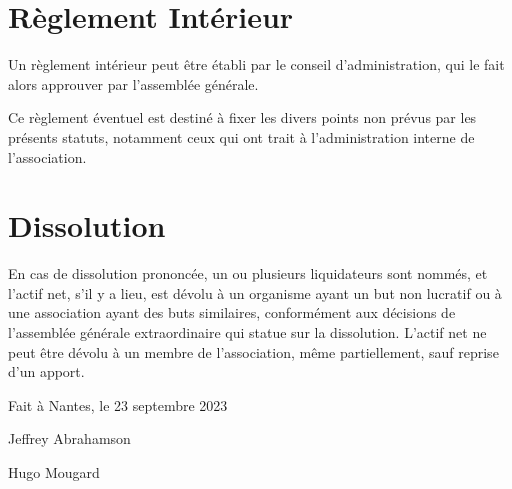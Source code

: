 \documentclass[11 pt]{article}
\begin{document}
\section{Règlement Intérieur}

Un règlement intérieur peut être établi par le conseil
d’administration, qui le fait alors approuver par l’assemblée
générale.

Ce règlement éventuel est destiné à fixer les divers points non prévus
par les présents statuts, notamment ceux qui ont trait à
l’administration interne de l’association.

\section{Dissolution}

En cas de dissolution prononcée, un ou plusieurs liquidateurs sont
nommés, et l’actif net, s’il y a lieu, est dévolu à un organisme ayant
un but non lucratif ou à une association ayant des buts similaires,
conformément aux décisions de l’assemblée générale extraordinaire qui
statue sur la dissolution. L’actif net ne peut être dévolu à un membre
de l’association, même partiellement, sauf reprise d’un apport.


\vspace{5 mm}
Fait à Nantes, le 23 septembre 2023

\vspace{1 cm}
Jeffrey Abrahamson

\vspace{1 cm}
Hugo Mougard
\end{document}
